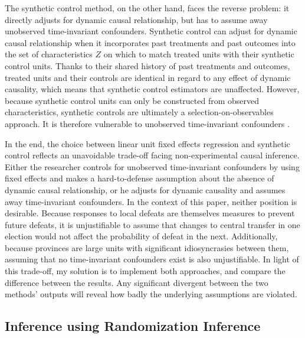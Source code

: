 \documentclass[12pt]{article}\usepackage[]{graphicx}\usepackage[]{color}
\newcommand{\1}{\mathbbm{1}}
\begin{document}
The synthetic control method, on the other hand, faces the reverse problem: it directly adjusts for dynamic causal relationship, but has to assume away unobserved time-invariant confounders. Synthetic control can adjust for dynamic causal relationship when it incorporates past treatments and past outcomes into the set of characteristics $Z$ on which to match treated units with their synthetic control units. Thanks to their shared history of past treatments and outcomes, treated units and their controls are identical in regard to any effect of dynamic causality, which means that synthetic control estimators are unaffected. However, because synthetic control units can only be constructed from observed characteristics, synthetic controls are ultimately a selection-on-observables approach. It is therefore vulnerable to unobserved time-invariant confounders \citep{ImaiKim2012}. 

In the end, the choice between linear unit fixed effects regression and synthetic control reflects an unavoidable trade-off facing non-experimental causal inference. Either the researcher controls for unobserved time-invariant confounders by using fixed effects and makes a hard-to-defense assumption about the absence of dynamic causal relationship, or he adjusts for dynamic causality and assumes away time-invariant confounders. In the context of this paper, neither position is desirable. Because responses to local defeats are themselves measures to prevent future defeats, it is unjustifiable to assume that changes to central transfer in one election would not affect the probability of defeat in the next. Additionally, because provinces are large units with significant idiosyncrasies between them, assuming that no time-invariant confounders exist is also unjustifiable. In light of this trade-off, my solution is to implement both approaches, and compare the difference between the results. Any significant divergent between the two methods' outputs will reveal how badly the underlying assumptions are violated.

\subsection{Inference using Randomization Inference}
\end{document}
